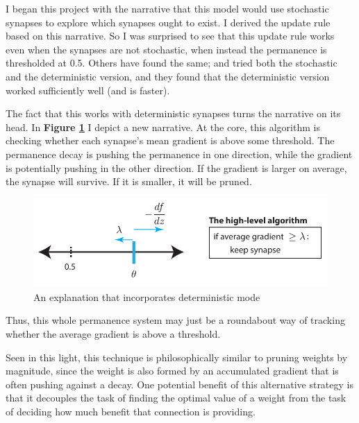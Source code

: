 \documentclass[11pt]{article}
\begin{document}
I began this project with the narrative that this model would use stochastic synapses to explore which synapses ought to exist. I derived the update rule based on this narrative. So I was surprised to see that this update rule works even when the synapses are not stochastic, when instead the permanence is thresholded at 0.5. Others have found the same; \citep{courbariaux2015binaryconnect} and \citep{courbariaux2016binarized} tried both the stochastic and the deterministic version, and they found that the deterministic version worked sufficiently well (and is faster).

The fact that this works with deterministic synapses turns the narrative on its head. In \textbf{Figure \ref{fig:narrative}} I depict a new narrative. At the core, this algorithm is checking whether each synapse's mean gradient is above some threshold. The permanence decay is pushing the permanence in one direction, while the gradient is potentially pushing in the other direction. If the gradient is larger on average, the synapse will survive. If it is smaller, it will be pruned.

\begin{figure}[htbp]
\centering
\includegraphics[width=.9\linewidth]{./figures/effective-algorithm.pdf}
\caption{An explanation that incorporates deterministic mode \label{fig:narrative}}
\end{figure}

Thus, this whole permanence system may just be a roundabout way of tracking whether the average gradient is above a threshold.

Seen in this light, this technique is philosophically similar to pruning weights by magnitude, since the weight is also formed by an accumulated gradient that is often pushing against a decay. One potential benefit of this alternative strategy is that it decouples the task of finding the optimal value of a weight from the task of deciding how much benefit that connection is providing.






\newpage
\end{document}
